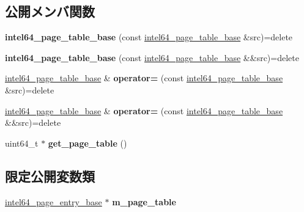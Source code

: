 \subsection*{公開メンバ関数}
\begin{DoxyCompactItemize}
\item 
\hypertarget{classintel64__page__table__base_a6f41188f43304f66eded8e4237f9b9df}{}{\bfseries intel64\+\_\+page\+\_\+table\+\_\+base} (const \hyperlink{classintel64__page__table__base}{intel64\+\_\+page\+\_\+table\+\_\+base} \&src)=delete\label{classintel64__page__table__base_a6f41188f43304f66eded8e4237f9b9df}

\item 
\hypertarget{classintel64__page__table__base_af03878ba31fbe3a1c5993f23b5060e6f}{}{\bfseries intel64\+\_\+page\+\_\+table\+\_\+base} (const \hyperlink{classintel64__page__table__base}{intel64\+\_\+page\+\_\+table\+\_\+base} \&\&src)=delete\label{classintel64__page__table__base_af03878ba31fbe3a1c5993f23b5060e6f}

\item 
\hypertarget{classintel64__page__table__base_a20ad57e3d3901f93e3bd15f00e4449ea}{}\hyperlink{classintel64__page__table__base}{intel64\+\_\+page\+\_\+table\+\_\+base} \& {\bfseries operator=} (const \hyperlink{classintel64__page__table__base}{intel64\+\_\+page\+\_\+table\+\_\+base} \&src)=delete\label{classintel64__page__table__base_a20ad57e3d3901f93e3bd15f00e4449ea}

\item 
\hypertarget{classintel64__page__table__base_a4b2fcdc5872bf6d20fe3aca38b78e8ac}{}\hyperlink{classintel64__page__table__base}{intel64\+\_\+page\+\_\+table\+\_\+base} \& {\bfseries operator=} (const \hyperlink{classintel64__page__table__base}{intel64\+\_\+page\+\_\+table\+\_\+base} \&\&src)=delete\label{classintel64__page__table__base_a4b2fcdc5872bf6d20fe3aca38b78e8ac}

\item 
\hypertarget{classintel64__page__table__base_a05562d9f2b7680c51216cee0ea1f28e1}{}uint64\+\_\+t $\ast$ {\bfseries get\+\_\+page\+\_\+table} ()\label{classintel64__page__table__base_a05562d9f2b7680c51216cee0ea1f28e1}

\end{DoxyCompactItemize}
\subsection*{限定公開変数類}
\begin{DoxyCompactItemize}
\item 
\hypertarget{classintel64__page__table__base_ac8b1275a4ac3ebf5f9d4cab59664307d}{}\hyperlink{classintel64__page__entry__base}{intel64\+\_\+page\+\_\+entry\+\_\+base} $\ast$ {\bfseries m\+\_\+page\+\_\+table}\label{classintel64__page__table__base_ac8b1275a4ac3ebf5f9d4cab59664307d}

\end{DoxyCompactItemize}


